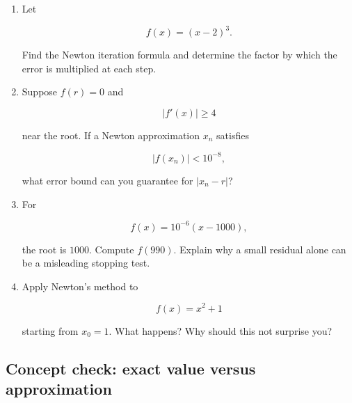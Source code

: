 \begin{enumerate}
\item Let

\[
f(x)=(x-2)^3.
\]

Find the Newton iteration formula and determine the factor by which the error is
multiplied at each step.

\item Suppose \(f(r)=0\) and

\[
|f'(x)|\ge 4
\]

near the root.  If a Newton approximation \(x_n\) satisfies

\[
|f(x_n)|<10^{-8},
\]

what error bound can you guarantee for \(|x_n-r|\)?

\item For

\[
f(x)=10^{-6}(x-1000),
\]

the root is \(1000\).  Compute \(f(990)\).  Explain why a small residual alone can be a
misleading stopping test.

\item Apply Newton's method to

\[
f(x)=x^2+1
\]

starting from \(x_0=1\).  What happens?  Why should this not surprise you?
\end{enumerate}

\subsection{Concept check: exact value versus approximation}
\label{subsec:chapter-12-concept-check}


